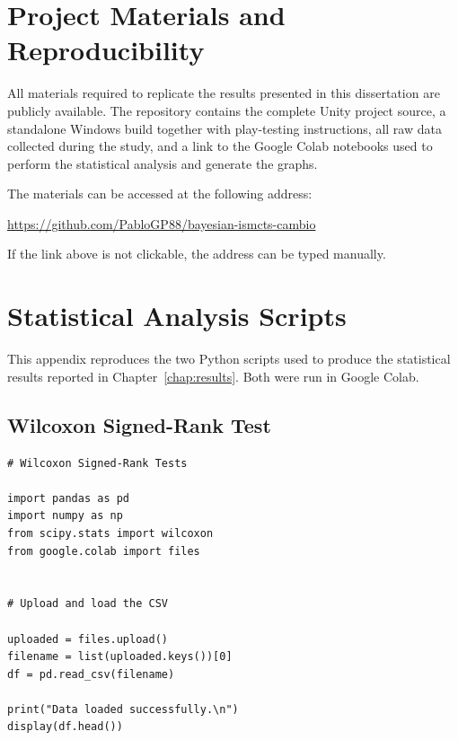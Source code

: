 \documentclass[12pt,a4paper,oneside]{report}
\begin{document}
\begin{appendices}

\chapter{Project Materials and Reproducibility}
\label{app:materials}

All materials required to replicate the results presented in this dissertation are publicly available. The repository contains the complete Unity project source, a standalone Windows build together with play-testing instructions, all
raw data collected during the study, and a link to the Google Colab notebooks used to perform the statistical analysis and generate the graphs.

The materials can be accessed at the following address:

\begin{center}
\url{https://github.com/PabloGP88/bayesian-ismcts-cambio}
\end{center}

\noindent If the link above is not clickable, the address can be typed manually.

\chapter{Statistical Analysis Scripts}
\label{app:scripts}

This appendix reproduces the two Python scripts used to produce the statistical
results reported in Chapter~\ref{chap:results}. Both were run in Google Colab. 

\section*{Wilcoxon Signed-Rank Test}  

\begin{lstlisting}[style=python]
# Wilcoxon Signed-Rank Tests

import pandas as pd
import numpy as np
from scipy.stats import wilcoxon
from google.colab import files


# Upload and load the CSV

uploaded = files.upload()
filename = list(uploaded.keys())[0]
df = pd.read_csv(filename)

print("Data loaded successfully.\n")
display(df.head())



\end{lstlisting}
\end{appendices}
\end{document}
